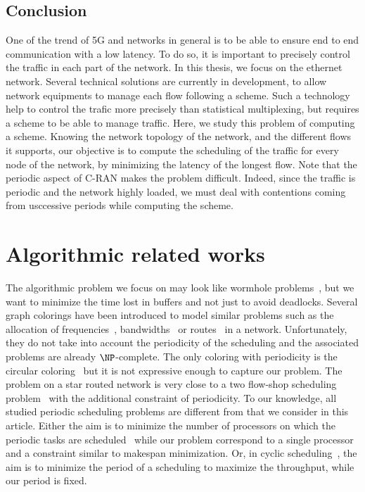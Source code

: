 \subsection{Conclusion}
One of the trend of 5G and networks in general is to be able to ensure end to end communication with a low latency. To do so, it is important to precisely control the traffic in each part of the network. In this thesis, we focus on the ethernet network. Several technical solutions are currently in development, to allow network equipments to manage each flow following a scheme. Such a technology help to control the trafic more precisely than statistical multiplexing, but requires a scheme to be able to manage traffic. 
Here, we study this problem of computing a scheme. Knowing the network topology of the network, and the different flows it supports, our objective is to compute the scheduling of the traffic for every node of the network, by minimizing the latency of the longest flow. Note that the periodic aspect of C-RAN makes the problem difficult. Indeed, since the traffic is periodic and the network highly loaded, we must deal with contentions coming from usccessive periods while computing the scheme.


\section{Algorithmic related works}
    

The algorithmic problem we focus on may look like wormhole problems~\cite{cole1996benefit}, but we want to minimize the time lost in buffers and not just to avoid deadlocks. Several graph colorings have been introduced to model similar problems such as the allocation of frequencies~\cite{borndorfer1998frequency}, bandwidths~\cite{erlebach2001complexity} or routes~\cite{cole1996benefit} in a network. Unfortunately, they do not take into account the periodicity of the scheduling and the associated problems are already $\NP$-complete. The only coloring with periodicity is the circular coloring~\cite{zhou2013multiple} but it is not expressive enough to capture our problem. 
The problem \pall on a star routed network is very close to a two flow-shop scheduling problem~\cite{yu2004minimizing} with the additional constraint of periodicity. To our knowledge, all studied periodic scheduling problems are different from \pall that we consider in this article. 
Either the aim is to minimize the number of processors on which the periodic tasks are scheduled~\cite{korst1991periodic,hanen1993cyclic} while our problem correspond to a single processor and a constraint similar to makespan minimization. Or, in cyclic scheduling~\cite{levner2010complexity}, the aim is to minimize the period of a scheduling to maximize the throughput, while our period is fixed. 

